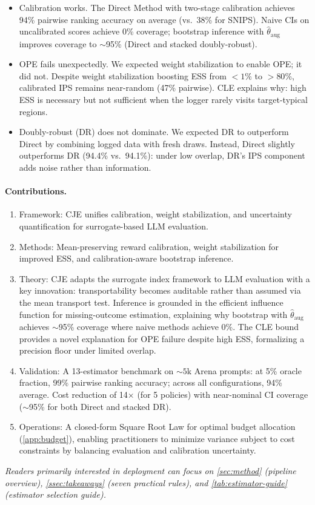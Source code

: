 \begin{itemize}[leftmargin=*,itemsep=2pt,topsep=2pt]
\item Calibration works. The Direct Method with two-stage calibration achieves 94\% pairwise ranking accuracy on average (vs.\ 38\% for SNIPS). Naive CIs on uncalibrated scores achieve 0\% coverage; bootstrap inference with $\hat\theta_{\mathrm{aug}}$ improves coverage to ${\sim}$95\% (Direct and stacked doubly-robust).
\item OPE fails unexpectedly. We expected weight stabilization to enable OPE; it did not. Despite weight stabilization boosting ESS from $<1\%$ to $>80\%$, calibrated IPS remains near-random (47\% pairwise). CLE explains why: high ESS is necessary but not sufficient when the logger rarely visits target-typical regions.
\item Doubly-robust (DR) does not dominate. We expected DR to outperform Direct by combining logged data with fresh draws. Instead, Direct slightly outperforms DR (94.4\% vs.\ 94.1\%): under low overlap, DR's IPS component adds noise rather than information.
\end{itemize}

\paragraph{Contributions.}
\begin{enumerate}[leftmargin=*,nosep]
\item Framework: CJE unifies calibration, weight stabilization, and uncertainty quantification for surrogate-based LLM evaluation.
\item Methods: Mean-preserving reward calibration, weight stabilization for improved ESS, and calibration-aware bootstrap inference.
\item Theory: CJE adapts the surrogate index framework to LLM evaluation with a key innovation: transportability becomes auditable rather than assumed via the mean transport test. Inference is grounded in the efficient influence function for missing-outcome estimation, explaining why bootstrap with $\hat\theta_{\mathrm{aug}}$ achieves ${\sim}$95\% coverage where naive methods achieve 0\%. The CLE bound provides a novel explanation for OPE failure despite high ESS, formalizing a precision floor under limited overlap.
\item Validation: A 13-estimator benchmark on ${\sim}5$k Arena prompts: at 5\% oracle fraction, 99\% pairwise ranking accuracy; across all configurations, 94\% average. Cost reduction of 14$\times$ (for 5 policies) with near-nominal CI coverage (${\sim}$95\% for both Direct and stacked DR).
\item Operations: A closed-form Square Root Law for optimal budget allocation (\cref{app:budget}), enabling practitioners to minimize variance subject to cost constraints by balancing evaluation and calibration uncertainty.
\end{enumerate}

\noindent\textit{Readers primarily interested in deployment can focus on \cref{sec:method} (pipeline overview), \cref{ssec:takeaways} (seven practical rules), and \cref{tab:estimator-guide} (estimator selection guide).}

